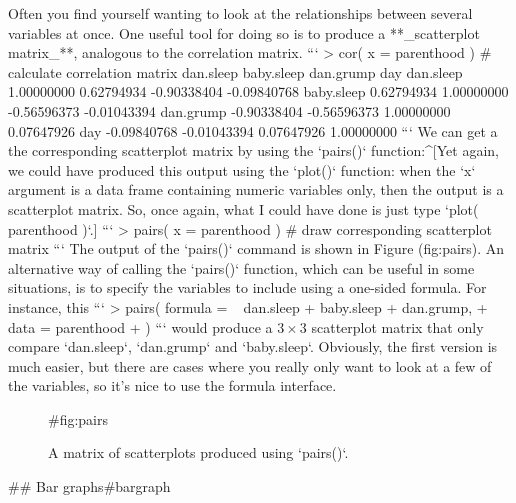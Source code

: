 Often you find yourself wanting to look at the relationships between several variables at once. One useful tool for doing so is to produce a **_scatterplot matrix_**, analogous to the correlation matrix. 
```
> cor( x = parenthood ) # calculate correlation matrix
             dan.sleep  baby.sleep   dan.grump         day
dan.sleep   1.00000000  0.62794934 -0.90338404 -0.09840768
baby.sleep  0.62794934  1.00000000 -0.56596373 -0.01043394
dan.grump  -0.90338404 -0.56596373  1.00000000  0.07647926
day        -0.09840768 -0.01043394  0.07647926  1.00000000
```
We can get a the corresponding scatterplot matrix by using the `pairs()` function:^[Yet again, we could have produced this output using the `plot()` function: when the `x` argument is a data frame containing numeric variables only, then the output is a scatterplot matrix. So, once again, what I could have done is just type `plot( parenthood )`.]
```
> pairs( x = parenthood ) # draw corresponding scatterplot matrix  
```
The output of the `pairs()` command is shown in Figure \@ref(fig:pairs).  An alternative way of calling the `pairs()` function, which can be useful in some situations, is to specify the variables to include using a one-sided formula. For instance, this
```
> pairs( formula = ~ dan.sleep + baby.sleep + dan.grump,
+        data = parenthood
+ )
```
would produce a $3 \times 3$ scatterplot matrix that only compare `dan.sleep`, `dan.grump` and `baby.sleep`. Obviously, the first version is much easier, but there are cases where you really only want to look at a few of the variables, so it's nice to use the formula interface.


\begin{figure}
\begin{center}
\caption{A matrix of scatterplots produced using `pairs()`.}
\HR
{#fig:pairs}
\end{center}
\end{figure}



## Bar graphs{#bargraph}

